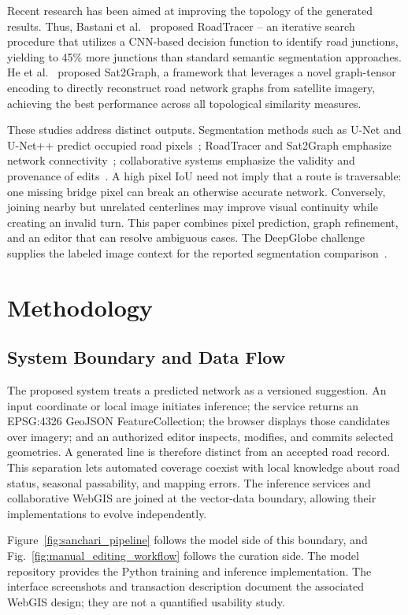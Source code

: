 \documentclass[10pt,a4paper,twocolumn]{article}
\begin{document}
Recent research has been aimed at improving the topology of the generated results. Thus, Bastani et al.~\cite{b9} proposed RoadTracer -- an iterative search procedure that utilizes a CNN-based decision function to identify road junctions, yielding to 45\% more junctions than standard semantic segmentation approaches. He et al.~\cite{b10} proposed Sat2Graph, a framework that leverages a novel graph-tensor encoding to directly reconstruct road network graphs from satellite imagery, achieving the best performance across all topological similarity measures.

These studies address distinct outputs. Segmentation methods such as U-Net and U-Net++ predict occupied road pixels~\cite{b11,b13}; RoadTracer and Sat2Graph emphasize network connectivity~\cite{b9,b10}; collaborative systems emphasize the validity and provenance of edits~\cite{b1,b2,b6}. A high pixel IoU need not imply that a route is traversable: one missing bridge pixel can break an otherwise accurate network. Conversely, joining nearby but unrelated centerlines may improve visual continuity while creating an invalid turn. This paper combines pixel prediction, graph refinement, and an editor that can resolve ambiguous cases. The DeepGlobe challenge supplies the labeled image context for the reported segmentation comparison~\cite{b16}.


\section{Methodology}

\subsection{System Boundary and Data Flow}
The proposed system treats a predicted network as a versioned suggestion. An input coordinate or local image initiates inference; the service returns an EPSG:4326 GeoJSON FeatureCollection; the browser displays those candidates over imagery; and an authorized editor inspects, modifies, and commits selected geometries. A generated line is therefore distinct from an accepted road record. This separation lets automated coverage coexist with local knowledge about road status, seasonal passability, and mapping errors. The inference services and collaborative WebGIS are joined at the vector-data boundary, allowing their implementations to evolve independently.

Figure~\ref{fig:sanchari_pipeline} follows the model side of this boundary, and Fig.~\ref{fig:manual_editing_workflow} follows the curation side. The model repository provides the Python training and inference implementation. The interface screenshots and transaction description document the associated WebGIS design; they are not a quantified usability study.
\end{document}
